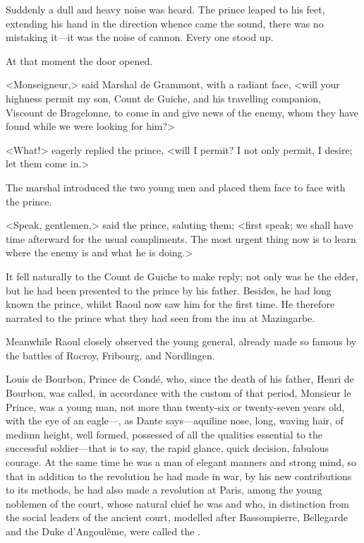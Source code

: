 Suddenly a dull and heavy noise was heard. The prince leaped to his feet, extending his hand in the direction whence came the sound, there was no mistaking it—it was the noise of cannon. Every one stood up.

At that moment the door opened.

<Monseigneur,> said Marshal de Grammont, with a radiant face, <will your highness permit my son, Count de Guiche, and his travelling companion, Viscount de Bragelonne, to come in and give news of the enemy, whom they have found while we were looking for him?>

<What!> eagerly replied the prince, <will I permit? I not only permit, I desire; let them come in.>

The marshal introduced the two young men and placed them face to face with the prince.

<Speak, gentlemen,> said the prince, saluting them; <first speak; we shall have time afterward for the usual compliments. The most urgent thing now is to learn where the enemy is and what he is doing.>

It fell naturally to the Count de Guiche to make reply; not only was he the elder, but he had been presented to the prince by his father. Besides, he had long known the prince, whilst Raoul now saw him for the first time. He therefore narrated to the prince what they had seen from the inn at Mazingarbe.

Meanwhile Raoul closely observed the young general, already made so famous by the battles of Rocroy, Fribourg, and Nordlingen.

Louis de Bourbon, Prince de Condé, who, since the death of his father, Henri de Bourbon, was called, in accordance with the custom of that period, Monsieur le Prince, was a young man, not more than twenty-six or twenty-seven years old, with the eye of an eagle—, as Dante says—aquiline nose, long, waving hair, of medium height, well formed, possessed of all the qualities essential to the successful soldier—that is to say, the rapid glance, quick decision, fabulous courage. At the same time he was a man of elegant manners and strong mind, so that in addition to the revolution he had made in war, by his new contributions to its methods, he had also made a revolution at Paris, among the young noblemen of the court, whose natural chief he was and who, in distinction from the social leaders of the ancient court, modelled after Bassompierre, Bellegarde and the Duke d'Angoulême, were called the .


